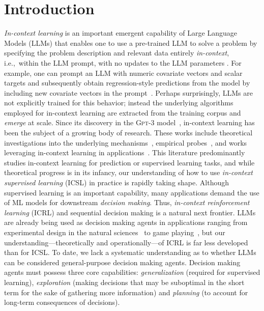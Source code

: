 \documentclass[11pt]{article}
\newcommand{\loose}{\looseness=-1}
\newcommand{\ie}{{i.e.,~\xspace}}
\begin{document}
\section{Introduction}
\label{sec:intro}
\emph{In-context learning} is an important emergent capability of Large Language Models (LLMs) that enables one to use a pre-trained LLM to solve a problem by specifying the problem description and relevant data entirely \emph{in-context}, \ie within the LLM prompt, with no updates to the LLM parameters \citep{gpt3-neurips20}.
For example, one can prompt an LLM with numeric covariate vectors and scalar targets and subsequently obtain regression-style predictions from the model by including new covariate vectors in the prompt~\citep{garg2022can}.
Perhaps surprisingly, LLMs are not explicitly trained for this behavior; instead
the underlying algorithms employed for in-context learning are extracted from the training corpus and \emph{emerge} at scale.
Since its discovery in the \textsc{Gpt-3} model~\citep{gpt3-neurips20}, in-context learning has been the subject of a growing body of research.
  These works include theoretical investigations into the underlying mechanisms~\citep[e.g.,][]{xie2021explanation,akyurek2022learning}, empirical probes~\citep[e.g.,][]{garg2022can,kirsch2022general}, and works leveraging in-context learning in applications~\citep[e.g.,][]{xu2022prompting,som2023demonstrations,edwards2023synergpt}.
This literature predominantly studies in-context learning for prediction or supervised learning tasks,
and while theoretical progress is in its infancy, our understanding of how to use \emph{in-context supervised learning} (ICSL) in practice is rapidly taking shape.\loose
Although supervised learning is an important capability, many applications demand the use of ML models for downstream \emph{decision making}.
Thus, \emph{in-context reinforcement learning} (ICRL) and sequential decision making is a natural next frontier.
LLMs are already being used as decision making agents in applications ranging from experimental design in the natural sciences~\citep{lee2023ai} to game playing~\citep{shinn2023reflexion,wang2023voyager}, but our understanding---theoretically and operationally---of ICRL is far less developed than for ICSL.
To date, we lack a systematic understanding as to whether LLMs can be
considered general-purpose decision making agents.
Decision making agents must possess three core capabilities: \emph{generalization} (required for supervised learning), \emph{exploration} (making decisions that may be suboptimal in the short term for the sake of gathering more information) and \emph{planning} (to account for long-term consequences of decisions).
\end{document}
